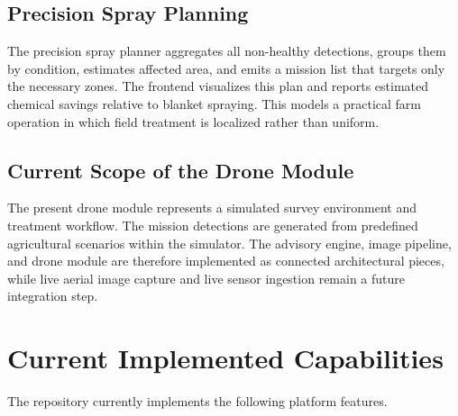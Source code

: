 \documentclass[11pt,a4paper]{article}
\begin{document}
\subsection{Precision Spray Planning}

The precision spray planner aggregates all non-healthy detections, groups them by condition, estimates affected area, and emits a mission list that targets only the necessary zones. The frontend visualizes this plan and reports estimated chemical savings relative to blanket spraying. This models a practical farm operation in which field treatment is localized rather than uniform.

\subsection{Current Scope of the Drone Module}

The present drone module represents a simulated survey environment and treatment workflow. The mission detections are generated from predefined agricultural scenarios within the simulator. The advisory engine, image pipeline, and drone module are therefore implemented as connected architectural pieces, while live aerial image capture and live sensor ingestion remain a future integration step.

\section{Current Implemented Capabilities}

The repository currently implements the following platform features.
\end{document}
